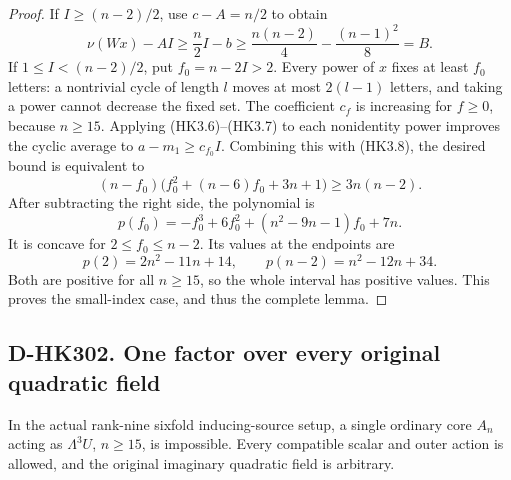\begin{proof}
If $I\ge(n-2)/2$, use $c-A=n/2$ to obtain
\[
 \nu(Wx)-AI\ge\frac n2I-b
     \ge\frac{n(n-2)}4-\frac{(n-1)^2}{8}=B.
 \tag{HK3.9}
\]
If $1\le I<(n-2)/2$, put $f_0=n-2I>2$.
Every power of $x$ fixes at least $f_0$ letters: a
nontrivial cycle of length $l$ moves at most $2(l-1)$
letters, and taking a power cannot decrease the fixed set.
The coefficient $c_f$ is increasing for $f\ge0$, because
$n\ge15$.  Applying (HK3.6)--(HK3.7) to each nonidentity
power improves the cyclic average to
$a-m_1\ge c_{f_0}I$.  Combining this with (HK3.8), the
desired bound is equivalent to
\[
 (n-f_0)\bigl(f_0^2+(n-6)f_0+3n+1\bigr)
                              \ge3n(n-2).
 \tag{HK3.10}
\]
After subtracting the right side, the polynomial is
\[
 p(f_0)=-f_0^3+6f_0^2+(n^2-9n-1)f_0+7n.
 \tag{HK3.11}
\]
It is concave for $2\le f_0\le n-2$.
Its values at the endpoints are
\[
                p(2)=2n^2-11n+14,\qquad
                p(n-2)=n^2-12n+34.
 \tag{HK3.12}
\]
Both are positive for all $n\ge15$, so the whole interval
has positive values.  This proves the small-index case,
and thus the complete lemma.
\end{proof}

\subsection*{D-HK302. One factor over every original quadratic field}

\begin{theorem}[D-HK302]
In the actual rank-nine sixfold inducing-source setup, a
single ordinary core $A_n$ acting as $\Lambda^3U$, $n\ge15$,
is impossible.  Every compatible scalar and outer action
is allowed, and the original imaginary quadratic field
is arbitrary.
\end{theorem}

